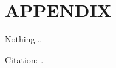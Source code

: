 \documentclass[letterpaper, 10 pt, conference]{ieeeconf}  %
\begin{document}
\section*{APPENDIX}

Nothing...

Citation: \cite{IEEEexample:article_typical}.


\balance

\makeatletter
\def\endthebibliography{%
	\def\@noitemerr{\@latex@warning{Empty `thebibliography' environment}}%
	\endlist
}
\makeatother



\end{document}
